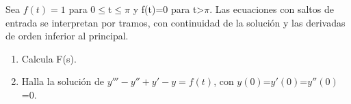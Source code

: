 Sea \(f(t)=1\) para 0\ensuremath{\le}t\ensuremath{\le}\ensuremath{\pi} y f(t)=0 para t>\ensuremath{\pi}. Las ecuaciones con saltos de entrada se interpretan por tramos, con continuidad de la solución y las derivadas de orden inferior al principal.

\begin{enumerate}[label=(\alph*),ref=\alph*,leftmargin=*]
\item Calcula F(s).
\item Halla la solución de \(y'''-y''+y'-y=f(t)\), con \(y(0)\)=\(y'(0)\)=\(y''(0)\)=0.
\end{enumerate}
